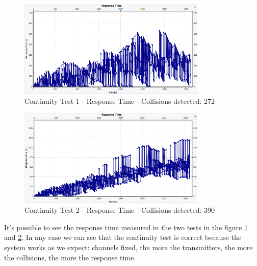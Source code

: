 \begin{figure}[H]
	\centering
	\includegraphics[width=0.8\textwidth]{img/continuityTest1a_responsetime.png}
	\caption{Continuity Test 1 - Response Time - Collisions detected: 272}
	\label {img: continuityTest1a_responsetime}
\end{figure}

\begin{figure}[H]
	\centering
	\includegraphics[width=0.8\textwidth]{img/continuityTest1b_responsetime.png}
	\caption{Continuity Test 2 - Response Time - Collisions detected: 390}
	\label {img: continuityTest1b_responsetime}
\end{figure}

\noindent It's possible to see the response time measured in the two tests in the figure \ref{img: continuityTest1a_responsetime} and \ref{img: continuityTest1b_responsetime}. In any case we can see that the continuity test is correct because the system works as we expect: channels fixed, the more the transmitters, the more the collisions, the more the response time.

